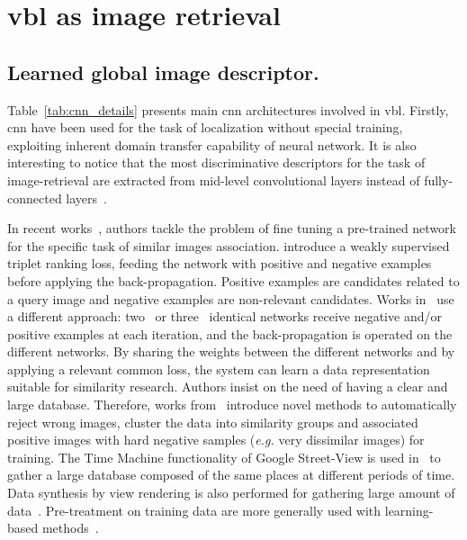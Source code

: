 \section{\Ac{vbl} as image retrieval}
\label{sec:cbir_data_for_loc}

\subsection{Learned global image descriptor.}
\label{subsec:cnn_as_global_desc}
Table~\ref{tab:cnn_details} presents main \ac{cnn} architectures involved in \ac{vbl}. Firstly, \ac{cnn} have been used for the task of localization without special training, exploiting inherent domain transfer capability of neural network. It is also interesting to notice that the most discriminative descriptors for the task of image-retrieval are extracted from mid-level convolutional layers instead of fully-connected layers~\citep{Babenko2014,Sunderhauf2015}.

In recent works~\citep{Arandjelovic2017,Radenovic2016, Gordo2016}, authors tackle the problem of fine tuning a pre-trained network for the specific task of similar images association. \citet{Arandjelovic2017} introduce a weakly supervised triplet ranking loss, feeding the network with positive and negative examples before applying the back-propagation. Positive examples are candidates related to a query image and negative examples are non-relevant candidates. Works in~\citep{Radenovic2016, Gordo2016} use a different approach: two~\citep{Radenovic2016} or three~\citep{Gordo2016} identical networks receive negative and/or positive examples at each iteration, and the back-propagation is operated on the different networks. By sharing the weights between the different networks and by applying a relevant common loss, the system can learn a data representation suitable for similarity research.	Authors insist on the need of having a clear and large database. Therefore, works from~\citep{Radenovic2016, Gordo2016} introduce novel methods to automatically reject wrong images, cluster the data into similarity groups and associated positive images with hard negative samples (\textit{e.g.} very dissimilar images) for training. The Time Machine functionality of Google Street-View is used in~\citep{Arandjelovic2017} to gather a large database composed of the same places at different periods of time. Data synthesis by view rendering is also performed for gathering large amount of data~\citep{Jia2016,Sizikova2016}.  Pre-treatment on training data are more generally used with learning-based methods~\citep{Kim2015,Cao2013}. 

